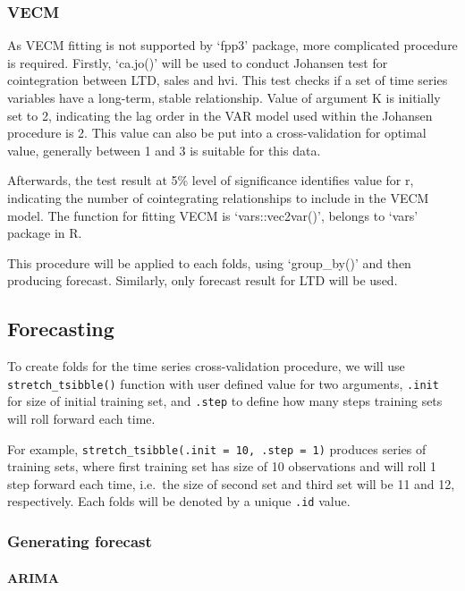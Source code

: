 \documentclass[11pt,a4paper,]{article}
\begin{document}
\subsubsection{VECM}\label{vecm}

As VECM fitting is not supported by `fpp3' package, more complicated procedure is required. Firstly, `ca.jo()' will be used to conduct Johansen test for cointegration between LTD, sales and hvi. This test checks if a set of time series variables have a long-term, stable relationship. Value of argument K is initially set to 2, indicating the lag order in the VAR model used within the Johansen procedure is 2. This value can also be put into a cross-validation for optimal value, generally between 1 and 3 is suitable for this data.

Afterwards, the test result at 5\% level of significance identifies value for r, indicating the number of cointegrating relationships to include in the VECM model. The function for fitting VECM is `vars::vec2var()', belongs to `vars' package in R.

This procedure will be applied to each folds, using `group\_by()' and then producing forecast. Similarly, only forecast result for LTD will be used.

\subsection{Forecasting}\label{forecasting}

To create folds for the time series cross-validation procedure, we will use \texttt{stretch\_tsibble()} function with user defined value for two arguments, \texttt{.init} for size of initial training set, and \texttt{.step} to define how many steps training sets will roll forward each time.

For example, \texttt{stretch\_tsibble(.init\ =\ 10,\ .step\ =\ 1)} produces series of training sets, where first training set has size of 10 observations and will roll 1 step forward each time, i.e.~the size of second set and third set will be 11 and 12, respectively. Each folds will be denoted by a unique \texttt{.id} value.

\subsubsection{Generating forecast}\label{generating-forecast}

\paragraph{ARIMA}\label{arima}
\end{document}
